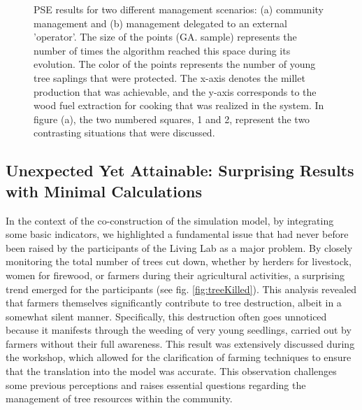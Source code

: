 \documentclass{article}
\begin{document}
\begin{figure}
        \caption{PSE results for two different management scenarios: (a) community management and (b) management delegated to an external 'operator'. The size of the points (GA. sample) represents the number of times the algorithm reached this space during its evolution. The color of the points represents the number of young tree saplings that were protected. The x-axis denotes the millet production that was achievable, and the y-axis corresponds to the wood fuel extraction for cooking that was realized in the system. In figure (a), the two numbered squares, 1 and 2, represent the two contrasting situations that were discussed.}\label{fig:PSE}
    \end{figure}

 \subsection{Unexpected Yet Attainable: Surprising Results with Minimal Calculations}

 In the context of the co-construction of the simulation model, by integrating some basic indicators, we highlighted a fundamental issue that had never before been raised by the participants of the Living Lab as a major problem. By closely monitoring the total number of trees cut down, whether by herders for livestock, women for firewood, or farmers during their agricultural activities, a surprising trend emerged for the participants (see fig. \ref{fig:treeKilled}). This analysis revealed that farmers themselves significantly contribute to tree destruction, albeit in a somewhat silent manner. Specifically, this destruction often goes unnoticed because it manifests through the weeding of very young seedlings, carried out by farmers without their full awareness. This result was extensively discussed during the workshop, which allowed for the clarification of farming techniques to ensure that the translation into the model was accurate. This observation challenges some previous perceptions and raises essential questions regarding the management of tree resources within the community.
\end{document}

